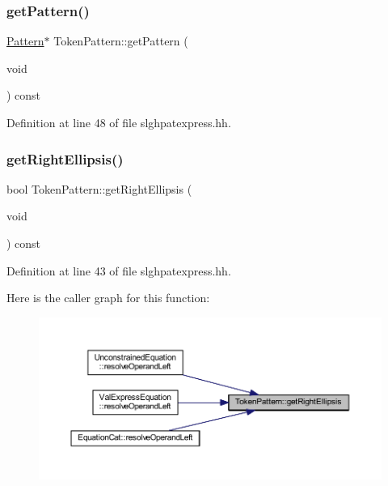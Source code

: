 \subsubsection{\texorpdfstring{getPattern()}{getPattern()}}
{\footnotesize\ttfamily \mbox{\hyperlink{class_pattern}{Pattern}}$\ast$ Token\+Pattern\+::get\+Pattern (\begin{DoxyParamCaption}\item[{void}]{ }\end{DoxyParamCaption}) const\hspace{0.3cm}{\ttfamily [inline]}}



Definition at line 48 of file slghpatexpress.\+hh.

\mbox{\label{class_token_pattern_aacd35c2555285d248400360e9bd9526f}} 
\subsubsection{\texorpdfstring{getRightEllipsis()}{getRightEllipsis()}}
{\footnotesize\ttfamily bool Token\+Pattern\+::get\+Right\+Ellipsis (\begin{DoxyParamCaption}\item[{void}]{ }\end{DoxyParamCaption}) const\hspace{0.3cm}{\ttfamily [inline]}}



Definition at line 43 of file slghpatexpress.\+hh.

Here is the caller graph for this function\+:
\nopagebreak
\begin{figure}[H]
\begin{center}
\leavevmode
\includegraphics[width=350pt]{class_token_pattern_aacd35c2555285d248400360e9bd9526f_icgraph}
\end{center}
\end{figure}
\mbox{\label{class_token_pattern_ae92469c4426988e363f1e8dd1f14a6e6}} 
